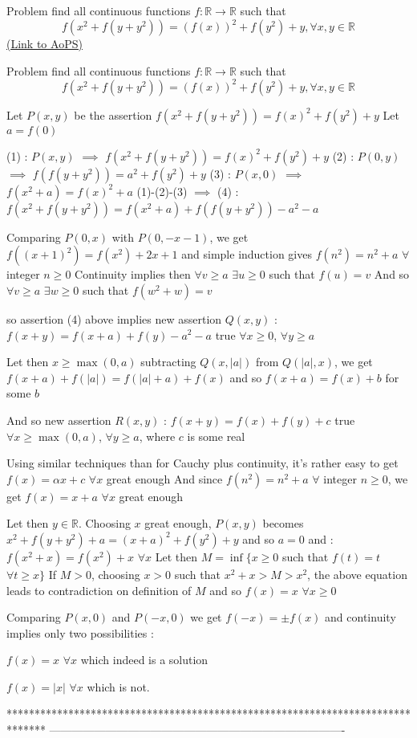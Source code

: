 \begin{problem}
	Problem find all continuous functions $f:\mathbb{R}\to\mathbb{R}$ such that 
\[f(x^2+f(y+y^2))=(f(x))^2+f(y^2)+y,\forall x,y\in\mathbb{R}\]
	\flushright \href{https://artofproblemsolving.com/community/c6h528113}{(Link to AoPS)}
\end{problem}



\begin{solution}
	\begin{tcolorbox}Problem find all continuous functions $f:\mathbb{R}\to\mathbb{R}$ such that 
\[f(x^2+f(y+y^2))=(f(x))^2+f(y^2)+y,\forall x,y\in\mathbb{R}\]\end{tcolorbox}
Let $P(x,y)$ be the assertion $f(x^2+f(y+y^2))=f(x)^2+f(y^2)+y$
Let $a=f(0)$

(1) : $P(x,y)$ $\implies$ $f(x^2+f(y+y^2))=f(x)^2+f(y^2)+y$
(2) : $P(0,y)$ $\implies$ $f(f(y+y^2))=a^2+f(y^2)+y$
(3) : $P(x,0)$ $\implies$ $f(x^2+a)=f(x)^2+a$
(1)-(2)-(3) $\implies$ (4) : $f(x^2+f(y+y^2))=f(x^2+a)+f(f(y+y^2))-a^2-a$

Comparing $P(0,x)$ with $P(0,-x-1)$, we get $f((x+1)^2)=f(x^2)+2x+1$ and simple induction gives $f(n^2)=n^2+a$ $\forall$ integer $n\ge 0$
Continuity implies then $\forall v\ge a$ $\exists u\ge 0$ such that $f(u)=v$
And so $\forall v\ge a$ $\exists w\ge 0$ such that $f(w^2+w)=v$

so assertion (4) above implies new assertion $Q(x,y)$ : $f(x+y)=f(x+a)+f(y)-a^2-a$ true $\forall x\ge 0$, $\forall y\ge a$

Let then $x\ge \max(0,a)$ subtracting $Q(x,|a|)$ from $Q(|a|,x)$, we get $f(x+a)+f(|a|)=f(|a|+a)+f(x)$ and so $f(x+a)=f(x)+b$ for some $b$

And so new assertion $R(x,y)$ : $f(x+y)=f(x)+f(y)+c$ true $\forall x\ge \max(0,a)$, $\forall y\ge a$, where $c$ is some real

Using similar techniques than for Cauchy plus continuity, it's rather easy to get $f(x)=\alpha x+c$ $\forall x$ great enough
And since $f(n^2)=n^2+a$ $\forall$ integer $n\ge 0$, we get $f(x)=x+a$ $\forall x$ great enough

Let then $y\in \mathbb R$. Choosing $x$ great enough, $P(x,y)$ becomes $x^2+f(y+y^2)+a=(x+a)^2+f(y^2)+y$ and so $a=0$ and :
$f(x^2+x)=f(x^2)+x$ $\forall x$
Let then $M=\inf\{x\ge 0$ such that $f(t)=t$ $\forall t\ge x\}$
If $M>0$, choosing $x>0$ such that $x^2+x>M>x^2$, the above equation leads to contradiction on definition of $M$ and so $f(x)=x$ $\forall x\ge 0$

Comparing $P(x,0)$ and $P(-x,0)$ we get $f(-x)=\pm f(x)$ and continuity implies only two possibilities :

$\boxed{f(x)=x}$ $\forall x$ which indeed is a solution

$f(x)=|x|$ $\forall x$ which is not.
\end{solution}
*******************************************************************************
-------------------------------------------------------------------------------

